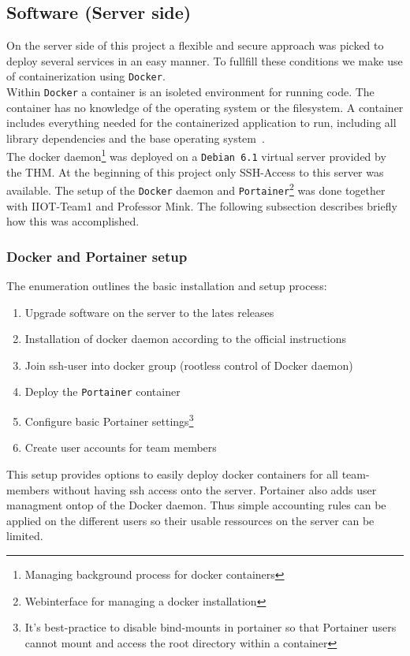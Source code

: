 \subsection{Software (Server side)}
	On the server side of this project a flexible and secure approach was picked to deploy several services in an easy manner. To fullfill these conditions we make use of containerization using \texttt{Docker}.\\ Within \texttt{Docker} a container is an isoleted environment for running code. The container has no knowledge of the operating system or the filesystem. A container includes everything needed for the containerized application to run, including all library dependencies and the base operating system~\cite{docker-gstarted}.\\
	The docker daemon\footnote{Managing background process for docker containers} was deployed on a \texttt{Debian 6.1} virtual server provided by the THM. At the beginning of this project only SSH-Access to this server was available. The setup of the \texttt{Docker} daemon and \texttt{Portainer}\footnote{Webinterface for managing a docker installation} was done together with IIOT-Team1 and Professor Mink. The following subsection describes briefly how this was accomplished.
	
	\subsubsection{Docker and Portainer setup}
		The enumeration outlines the basic installation and setup process:
		\begin{enumerate}
			\item Upgrade software on the server to the lates releases
			\item Installation of docker daemon according to the official instructions~\cite{docker-install}
			\item Join ssh-user into docker group (rootless control of Docker daemon)
			\item Deploy the \texttt{Portainer} container
			\item Configure basic Portainer settings\footnote{It's best-practice to disable bind-mounts in portainer so that Portainer users cannot mount and access the root directory within a container}
			\item Create user accounts for team members
		\end{enumerate}
		
		This setup provides options to easily deploy docker containers for all team-members without having ssh access onto the server. Portainer also adds user managment ontop of the Docker daemon. Thus simple accounting rules can be applied on the different users so their usable ressources on the server can be limited. 
		

